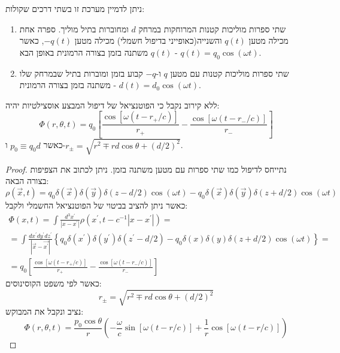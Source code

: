 \documentclass{tstextbook}
\begin{document}
\begin{definition}
ניתן לדמיין מערכת זו בשתי דרכים שקולות:

\end{definition}
\begin{enumerate}
  \item שתי ספרות מוליכות קטנות המרוחקות במרחק \(d\) ומחוברות בתיל מוליך. ספרה אחת מכילה מטען \(q(t)\) והשנייה(כאופייני בדיפול חשמלי) מכילה מטען \(-q(t)\), כאשר \(q(t)\) משתנה בזמן בצורה הרמונית באופן הבא - \(q(t)=q_{0}\cos\left( \omega t \right)\). 


  \item שתי ספרות מוליכות קטנות עם מטען \(q\) ו-\(-q\) קבוע בזמן ומוברות בתיל שבמרחק שלו משתנה בזמן בצורה הרמונית - \(d(t)=d_{0}\cos\left( \omega t \right)\). 


\end{enumerate}
\begin{proposition}
ללא קירוב נקבל כי הפוטנציאל של דיפול המבצע אוסצילטיות יהיה:
$$\Phi\left( r,\theta,t \right)=q_{0}\left[\frac{\cos[\omega(t-r_{+}/c)]}{r_{+}}-\frac{\cos[\omega(t-r_{-}/c)]}{r_{-}}\right]$$
כאשר \(p_{0}\equiv q_{0}d\) ו-\(r_{\pm}=\sqrt{r^{2}\mp r d\cos\theta+(d/2)^{2}}\).

\end{proposition}
\begin{proof}
נתייחס לדיפול כמו שתי ספרות עם מטען משתנה בזמן. ניתן לכתוב את הצפיפות בצורה הבאה:
$$\rho({\vec{x}},t)=q_{0}\delta({\vec{x}})\delta({\vec{y}})\delta(z-d/2)\cos(\omega t)-q_{0}\delta({\vec{x}})\delta({\vec{y}})\delta(z+d/2)\cos(\omega t)$$
כאשר ניתן להציב בביטוי של הפוטנציאל החשמלי ולקבל:
\begin{gather*}\Phi(x,t)=\int\frac{d^{3}x^{\prime}}{|x-x^{\prime}|}\rho(x^{\prime},t-c^{-1}|x-x^{\prime}|)= \\=\int{\frac{d x^{\prime}d y^{\prime}d z^{\prime}}{|{\vec{x}}-{\vec{x^{\prime}}}|}}\left\{q_{0}\delta(x^{\prime})\delta(y^{\prime})\delta(z^{\prime}-d/2)-q_{0}\delta(x)\delta(y)\delta(z+d/2)\cos(\omega t)\right\}= \\=q_{0}\left[\frac{\cos[\omega(t-r_{+}/c)]}{r_{+}}-\frac{\cos[\omega(t-r_{-}/c)]}{r_{-}}\right]
\end{gather*}
כאשר לפי משפט הקוסינוסים:
$$r_{\pm}=\sqrt{r^{2}\mp r d\cos\theta+(d/2)^{2}}$$
נציב ונקבל את המבוקש:
$$\Phi\left( r,\theta,t \right)={\frac{p_{0}\cos\theta}{r}}\left(-{\frac{\omega}{c}}\sin\left[ \omega(t-r/c) \right]+{\frac{1}{r}}\cos\left[ \omega(t-r/c) \right]\right)$$

\end{proof}
\end{document}
